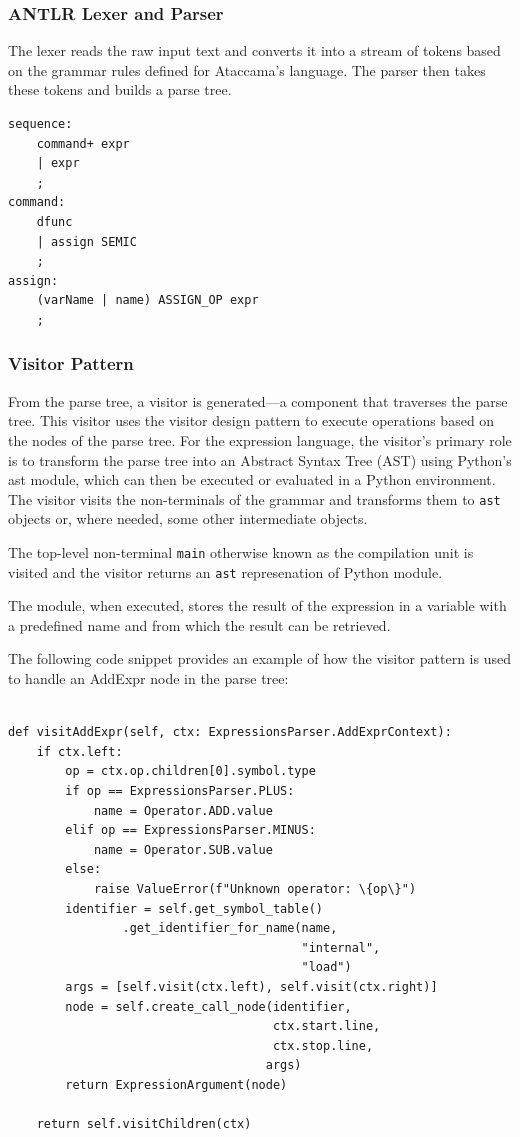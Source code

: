 \subsubsection{ANTLR Lexer and Parser}

The lexer reads the raw input text and converts it into a stream of tokens based on the grammar rules defined for Ataccama’s language. The parser then takes these tokens and builds a parse tree.


\begin{verbatim}
sequence:
    command+ expr
    | expr
    ;
command:
    dfunc
    | assign SEMIC
    ;
assign:
    (varName | name) ASSIGN_OP expr
    ;
\end{verbatim}

\subsubsection{Visitor Pattern}
 From the parse tree, a visitor is generated—a component that traverses the parse tree. This visitor uses the visitor design pattern to execute operations based on the nodes of the parse tree. For the expression language, the visitor's primary role is to transform the parse tree into an Abstract Syntax Tree (AST) using Python’s ast module, which can then be executed or evaluated in a Python environment. The visitor visits the non-terminals of the grammar and transforms them to \texttt{ast} objects or, where needed, some other intermediate objects.

The top-level non-terminal \texttt{main} otherwise known as the compilation unit is visited and the visitor returns an \texttt{ast} represenation of Python module.

The module, when executed, stores the result of the expression in a variable with a predefined name and from which the result can be retrieved.

The following code snippet provides an example of how the visitor pattern is used to handle an AddExpr node in the parse tree:

\begin{verbatim}
    
def visitAddExpr(self, ctx: ExpressionsParser.AddExprContext):
    if ctx.left:
        op = ctx.op.children[0].symbol.type
        if op == ExpressionsParser.PLUS:
            name = Operator.ADD.value
        elif op == ExpressionsParser.MINUS:
            name = Operator.SUB.value
        else:
            raise ValueError(f"Unknown operator: \{op\}")
        identifier = self.get_symbol_table()
                .get_identifier_for_name(name,
                                         "internal",
                                         "load")
        args = [self.visit(ctx.left), self.visit(ctx.right)]
        node = self.create_call_node(identifier, 
                                     ctx.start.line,
                                     ctx.stop.line,
                                    args)
        return ExpressionArgument(node)

    return self.visitChildren(ctx)

\end{verbatim}

